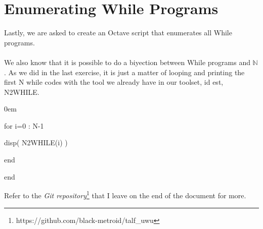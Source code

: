 \documentclass[11pt]{article}
\begin{document}
\section{Enumerating While Programs}
Lastly, we are asked to create an Octave script that enumerates all While programs.
\\\\
We also know that it is possible to do a biyection between While programs and $\mathbb{N}$. As we did in the last exercise, it is just a matter of looping and printing the first N while codes with the tool we already have in our toolset, id est, N2WHILE.

\begin{description}
\itemsep0em 
\item [function printNVectors(N)]
\item for i=0 : N-1
\addtolength{\itemindent}{0.80cm}
\item disp( N2WHILE(i) )
\addtolength{\itemindent}{0.00cm}
\item end
\item end
\end{description}

\setlength\parindent{0cm}

Refer to the \emph{Git repository}\footnote{https://github.com/black-metroid/talf\_uwu} that I leave on the end of the document for more.
\end{document}
